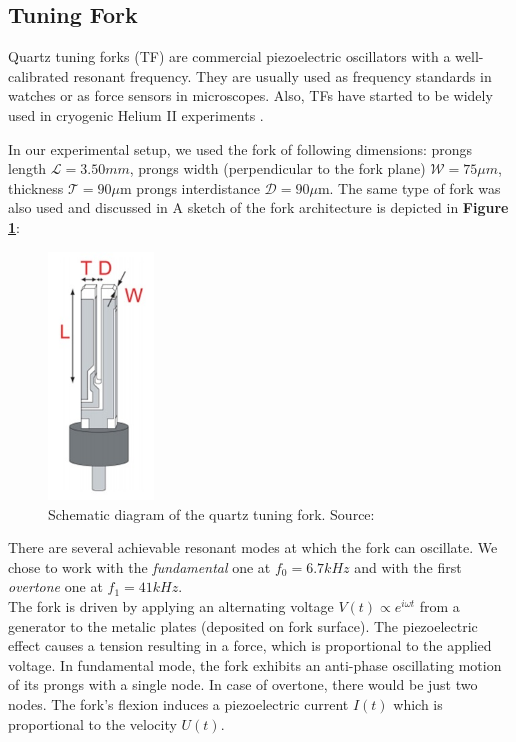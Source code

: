 \newpage

\subsection*{Tuning Fork}

Quartz tuning forks (TF) are commercial piezoelectric oscillators with a well-calibrated resonant frequency. They are usually used as frequency standards in watches or as force sensors in microscopes. Also, TFs have started to be widely used in cryogenic Helium II experiments \cite{forks}.

In our experimental setup, we used the fork of following dimensions: prongs length $ \mathcal{L} = 3.50\unit{mm} $, prongs width (perpendicular to the fork plane) $ \mathcal{W}=75 \mu\unit{m} $, thickness $ \mathcal{T}=90\mu\text{m} $ prongs interdistance $ \mathcal{D}=90\mu\text{m} $.
The same type of fork was also used and discussed in \cite{fork-exp} \cite{multiple-vels} A sketch of the fork architecture is depicted in \textbf{Figure \ref{fork}}:

\begin{figure}[h]
	\centering
	\includegraphics[width=0.25\textwidth]{graphics/exp/quartz}
	\caption{Schematic diagram of the quartz tuning fork. Source: \cite{bakalaris}}
	\label{fork}
\end{figure}

There are several achievable resonant modes at which the fork can oscillate. We chose to work with the \textit{fundamental} one at $f_0 = 6.7 \unit{kHz}$ and with the first \textit{overtone} one at $f_1 = 41 \unit{kHz}$.\\
The fork is driven by applying an alternating voltage $V(t) \propto e^{i\omega t}$ from a generator to the metalic plates (deposited on fork surface). The piezoelectric effect causes a tension resulting in a force, which is proportional to the applied voltage. In fundamental mode, the fork exhibits an anti-phase oscillating motion of its prongs with a single node. In case of overtone, there would be just two nodes. The fork's flexion induces a piezoelectric current $I(t)$ which is proportional to the velocity $U(t)$.

